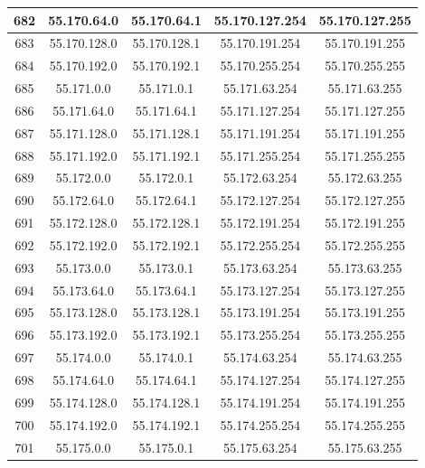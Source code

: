 \documentclass[letterpaper,12pt]{article}
\begin{document}
\begin{center}
\begin{longtable}{|c|c|c|c|c|}
                682 & 55.170.64.0 & 55.170.64.1 & 55.170.127.254 & 55.170.127.255 \\ \hline
                683 & 55.170.128.0 & 55.170.128.1 & 55.170.191.254 & 55.170.191.255 \\ \hline
                684 & 55.170.192.0 & 55.170.192.1 & 55.170.255.254 & 55.170.255.255 \\ \hline
                685 & 55.171.0.0 & 55.171.0.1 & 55.171.63.254 & 55.171.63.255 \\ \hline
                686 & 55.171.64.0 & 55.171.64.1 & 55.171.127.254 & 55.171.127.255 \\ \hline
                687 & 55.171.128.0 & 55.171.128.1 & 55.171.191.254 & 55.171.191.255 \\ \hline
                688 & 55.171.192.0 & 55.171.192.1 & 55.171.255.254 & 55.171.255.255 \\ \hline
                689 & 55.172.0.0 & 55.172.0.1 & 55.172.63.254 & 55.172.63.255 \\ \hline
                690 & 55.172.64.0 & 55.172.64.1 & 55.172.127.254 & 55.172.127.255 \\ \hline
                691 & 55.172.128.0 & 55.172.128.1 & 55.172.191.254 & 55.172.191.255 \\ \hline
                692 & 55.172.192.0 & 55.172.192.1 & 55.172.255.254 & 55.172.255.255 \\ \hline
                693 & 55.173.0.0 & 55.173.0.1 & 55.173.63.254 & 55.173.63.255 \\ \hline
                694 & 55.173.64.0 & 55.173.64.1 & 55.173.127.254 & 55.173.127.255 \\ \hline
                695 & 55.173.128.0 & 55.173.128.1 & 55.173.191.254 & 55.173.191.255 \\ \hline
                696 & 55.173.192.0 & 55.173.192.1 & 55.173.255.254 & 55.173.255.255 \\ \hline
                697 & 55.174.0.0 & 55.174.0.1 & 55.174.63.254 & 55.174.63.255 \\ \hline
                698 & 55.174.64.0 & 55.174.64.1 & 55.174.127.254 & 55.174.127.255 \\ \hline
                699 & 55.174.128.0 & 55.174.128.1 & 55.174.191.254 & 55.174.191.255 \\ \hline
                700 & 55.174.192.0 & 55.174.192.1 & 55.174.255.254 & 55.174.255.255 \\ \hline
                701 & 55.175.0.0 & 55.175.0.1 & 55.175.63.254 & 55.175.63.255 \\ \hline

\end{longtable}
\end{center}
\end{document}
